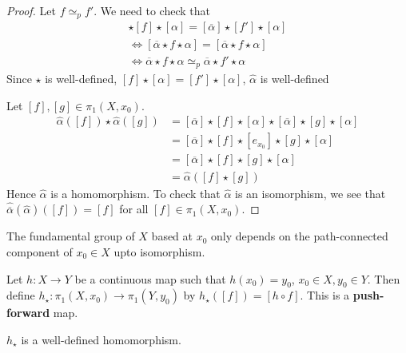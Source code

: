 \documentclass[12pt]{amsart}
\begin{document}
\begin{proof}
    Let $f \simeq_p f'$. We need to check that 
    \begin{align*}
    [\overline{\alpha}] \star [f] \star [\alpha]  = [\overline{\alpha}] \star [f'] \star [\alpha]  
    \\ 
    \iff [\overline{\alpha} \star f \star \alpha]  = [\overline{\alpha} \star f \star \alpha] 
    \\
    \iff \overline{\alpha} \star f \star \alpha \simeq_p \overline{\alpha} \star f' \star \alpha
    \end{align*}
    Since $\star$ is well-defined, $[f] \star [\alpha] = [f'] \star [\alpha]$,  $\widehat{\alpha}$ is well-defined


    Let $[f], [g] \in \pi_1(X, x_0)$. 
    \begin{align*}
        \widehat{\alpha}([f]) \star \widehat{\alpha} ([g]) &= [\overline{\alpha}] \star [f] \star [\alpha] \star  [\overline{\alpha}] \star [g] \star [\alpha] \\ 
        &=  [\overline{\alpha}] \star [f] \star [e_{x_0}] \star [g] \star [\alpha] \\
        &=  [\overline{\alpha}] \star [f] \star [g] \star [\alpha] \\ 
        &= \widehat{\alpha}([f] \star [g])
    \end{align*}
    Hence $\widehat{\alpha}$ is a homomorphism. To check that $\widehat{\alpha}$ is an isomorphism, we see that $\widehat{\overline{\alpha}} (\widehat{\alpha}) ([f]) = [f]$ for all $[f] \in \pi_1(X, x_0)$.  
\end{proof}

\begin{corollary}
    The fundamental group of $X$ based at $x_0$ only depends on the path-connected component of $x_0 \in X$ upto isomorphism. 
\end{corollary}

\begin{definition}
    Let $h: X \to Y$ be a continuous map such that $h(x_0) = y_0$, $x_0 \in X, y_0 \in Y$. Then define $h_\star: \pi_1(X, x_0) \to \pi_1(Y, y_0)$ by $h_\star([f]) = [h \circ f]$. This is a \textbf{push-forward} map. 
\end{definition}

\begin{proposition}
    $h_\star$ is a well-defined homomorphism. 
\end{proposition}
\end{document}
